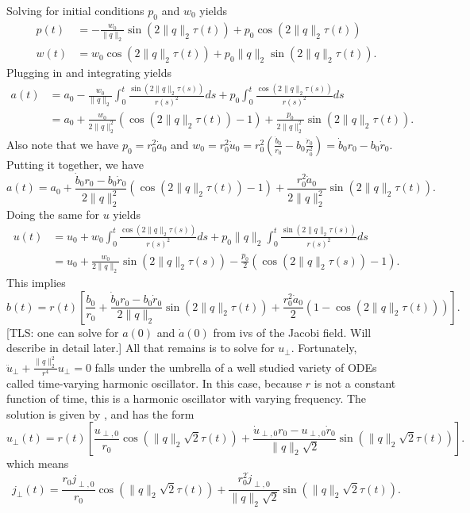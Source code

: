 \documentclass{article}
\newcommand{\tls}[1]{{\color{cyan}[TLS: #1]}}
\begin{document}
Solving for initial conditions $p_0$ and $w_0$ yields
\begin{align*}
    p(t) &= -\frac{w_0}{\|q\|_2}\sin(2\|q\|_2\tau(t)) + p_0\cos(2\|q\|_2\tau(t)) \\
    w(t) &= w_0\cos(2\|q\|_2\tau(t)) + p_0\|q\|_2\sin(2\|q\|_2\tau(t)).
\end{align*}
Plugging in and integrating yields
\begin{align*}
    a(t) &= a_0 -\frac{w_0}{\|q\|_2} \int_0^t\frac{\sin(2\|q\|_2\tau(s))}{r(s)^2}ds + p_0 \int_0^t \frac{\cos(2\|q\|_2\tau(s))}{r(s)^2} ds \\
    &= a_0 + \frac{w_0}{2\|q\|_2^2}(\cos(2\|q\|_2\tau(t)) - 1) + \frac{p_0}{2\|q\|_2^2}\sin(2\|q\|_2\tau(t)).
\end{align*}
Also note that we have $p_0 = r_0^2\dot a_0$ and $w_0 = r_0^2\dot u_0 = r_0^2 (\frac{\dot b_0}{r_0} - b_0\frac{\dot r_0}{r_0^2}) = \dot b_0r_0 - b_0\dot r_0.$ Putting it together, we have
\begin{equation}
    \boxed{a(t) = a_0 + \frac{\dot b_0r_0 - b_0\dot r_0}{2\|q\|_2^2}(\cos(2\|q\|_2\tau(t))-1) + \frac{r_0^2\dot a_0}{2\|q\|_2^2}\sin(2\|q\|_2\tau(t)).}
\end{equation}
Doing the same for $u$ yields
\begin{align*}
    u(t) &= u_0 + w_0 \int_0^t\frac{\cos(2\|q\|_2\tau(s))}{r(s)^2}ds + p_0 \|q\|_2 \int_0^t \frac{\sin(2\|q\|_2\tau(s))}{r(s)^2} ds \\
    &= u_0 + \frac{w_0}{2\|q\|_2}\sin(2\|q\|_2\tau(s)) - \frac{p_0}{2} (\cos(2\|q\|_2\tau(s))-1).
\end{align*}
This implies
\begin{equation}
    \boxed{b(t) = r(t)\left[\frac{b_0}{r_0} + \frac{\dot b_0r_0 - b_0\dot r_0}{2\|q\|_2}\sin(2\|q\|_2\tau(t)) + \frac{r_0^2\dot a_0}{2} (1- \cos(2\|q\|_2\tau(t)))\right].}
\end{equation}
\tls{one can solve for $a(0)$ and $\dot a(0)$ from ivs of the Jacobi field. Will describe in detail later.} All that remains is to solve for $u_\perp$. 
Fortunately, $\ddot u_{\perp} + \frac{\|q\|_2^2}{r^4}u_\perp = 0$ falls under the umbrella of a well studied variety of ODEs called time-varying harmonic oscillator. In this case, because $r$ is not a constant function of time, this is a harmonic oscillator with varying frequency. The solution is given by , and has the form
\begin{equation}
    u_{\perp}(t) = r(t)\left[\frac{u_{\perp,0}}{r_0}\cos(\|q\|_2\sqrt{2}\tau(t)) + \frac{\dot u_{\perp,0} r_0 - u_{\perp,0} \dot r_0}{\|q\|_2\sqrt{2}}\sin(\|q\|_2\sqrt{2}\tau(t))\right].
\end{equation}
which means 
\begin{equation}
    \boxed{j_{\perp}(t) = \frac{r_0j_{\perp,0}}{r_0}\cos(\|q\|_2\sqrt{2}\tau(t)) + \frac{r_0^2\dot j_{\perp, 0}}{\|q\|_2\sqrt{2}}\sin(\|q\|_2\sqrt{2}\tau(t)).}
\end{equation}
\end{document}
